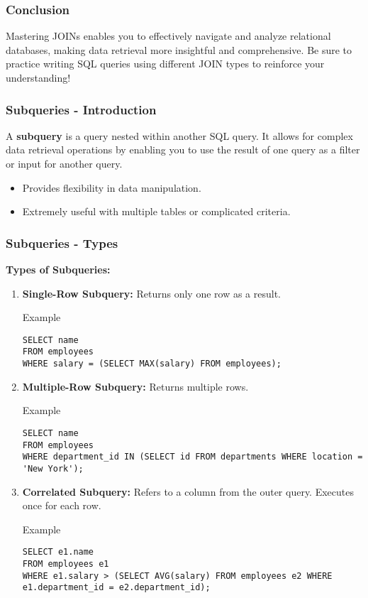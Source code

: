 \documentclass[aspectratio=169]{beamer}
\begin{document}
\begin{frame}
    \frametitle{Conclusion}
    Mastering JOINs enables you to effectively navigate and analyze relational databases, making data retrieval more insightful and comprehensive. 
    Be sure to practice writing SQL queries using different JOIN types to reinforce your understanding!
\end{frame}

\begin{frame}[fragile]
    \frametitle{Subqueries - Introduction}
    A \textbf{subquery} is a query nested within another SQL query. It allows for complex data retrieval operations by enabling you to use the result of one query as a filter or input for another query. 
    \begin{itemize}
        \item Provides flexibility in data manipulation.
        \item Extremely useful with multiple tables or complicated criteria.
    \end{itemize}
\end{frame}

\begin{frame}[fragile]
    \frametitle{Subqueries - Types}
    \textbf{Types of Subqueries:}
    \begin{enumerate}
        \item \textbf{Single-Row Subquery:} Returns only one row as a result.
            \begin{block}{Example}
            \begin{lstlisting}
SELECT name 
FROM employees 
WHERE salary = (SELECT MAX(salary) FROM employees);
            \end{lstlisting}
            \end{block}
        
        \item \textbf{Multiple-Row Subquery:} Returns multiple rows.
            \begin{block}{Example}
            \begin{lstlisting}
SELECT name 
FROM employees 
WHERE department_id IN (SELECT id FROM departments WHERE location = 'New York');
            \end{lstlisting}
            \end{block}
        
        \item \textbf{Correlated Subquery:} Refers to a column from the outer query. Executes once for each row.
            \begin{block}{Example}
            \begin{lstlisting}
SELECT e1.name 
FROM employees e1 
WHERE e1.salary > (SELECT AVG(salary) FROM employees e2 WHERE e1.department_id = e2.department_id);
            \end{lstlisting}
            \end{block}
    \end{enumerate}
\end{frame}
\end{document}
